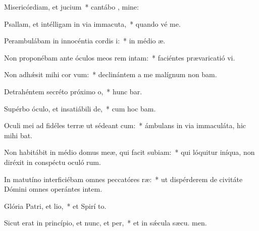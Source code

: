 \item Misericórdiam, et jucium~* cantábo , mine:
\item Psallam, et intélligam in via immacuta,~* quando vé  me.
\item Perambulábam in innocéntia cordis i:~* in médio  æ.
\item Non proponébam ante óculos meos rem intam:~* faciéntes prævaricatió vi.
\item Non adhǽsit mihi cor vum:~* declinántem a me malígnum non bam.
\item Detrahéntem secréto próximo o,~* hunc bar.
\item Supérbo óculo, et insatiábili de,~* cum hoc  bam.
\item Oculi mei ad fidéles terræ ut sédeant cum:~* ámbulans in via immaculáta, hic mihi bat.
\item Non habitábit in médio domus meæ, qui facit subiam:~* qui lóquitur iníqua, non diréxit in conspéctu oculó rum.
\item In matutíno interficiébam omnes peccatóres ræ:~* ut dispérderem de civitáte Dómini omnes operántes intem.
\item Glória Patri, et lio,~* et Spirí to.
\item Sicut erat in princípio, et nunc, et per,~* et in sǽcula sæcu. men.
